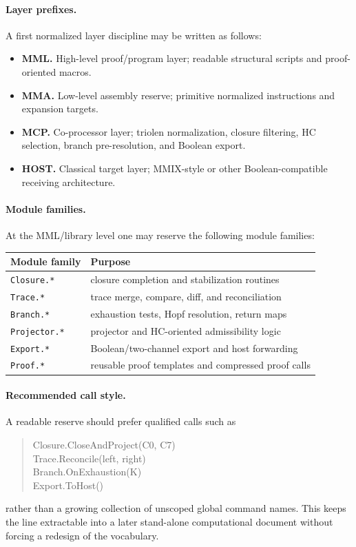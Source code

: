 \paragraph{Layer prefixes.}
A first normalized layer discipline may be written as follows:
\begin{itemize}[leftmargin=2em]
    \item \textbf{MML.} High-level proof/program layer; readable structural scripts and proof-oriented macros.
    \item \textbf{MMA.} Low-level assembly reserve; primitive normalized instructions and expansion targets.
    \item \textbf{MCP.} Co-processor layer; triolen normalization, closure filtering, HC selection, branch pre-resolution, and Boolean export.
    \item \textbf{HOST.} Classical target layer; MMIX-style or other Boolean-compatible receiving architecture.
\end{itemize}

\paragraph{Module families.}
At the MML/library level one may reserve the following module families:
\begin{center}
\begin{tabular}{@{}ll@{}}
\toprule
Module family & Purpose \\
\midrule
\texttt{Closure.*} & closure completion and stabilization routines \\
\texttt{Trace.*} & trace merge, compare, diff, and reconciliation \\
\texttt{Branch.*} & exhaustion tests, Hopf resolution, return maps \\
\texttt{Projector.*} & projector and HC-oriented admissibility logic \\
\texttt{Export.*} & Boolean/two-channel export and host forwarding \\
\texttt{Proof.*} & reusable proof templates and compressed proof calls \\
\bottomrule
\end{tabular}
\end{center}

\paragraph{Recommended call style.}
A readable reserve should prefer qualified calls such as
\begin{quote}
\ttfamily
Closure.CloseAndProject(C0, C7)\\
Trace.Reconcile(left, right)\\
Branch.OnExhaustion(K)\\
Export.ToHost() 
\end{quote}
rather than a growing collection of unscoped global command names. This keeps the line extractable into a later stand-alone computational document without forcing a redesign of the vocabulary.

